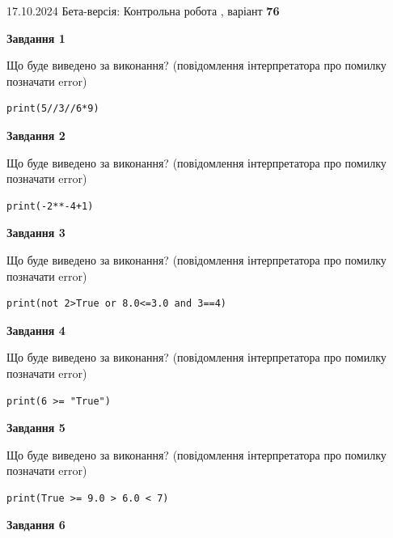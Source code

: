\documentclass[12pt, ukrainian]{article}
\begin{document}
{\Large{17.10.2024 Бета-версія: Контрольна робота , варіант  \No \textbf { 76 }\par}}
{
\begin {large}
{\begin {center}\textbf{Завдання 1}\end {center}}

Що буде виведено за виконання? (повідомлення інтерпретатора про помилку позначати error)\par
\begin{verbatim}
print(5//3//6*9)
\end{verbatim}

{\begin {center}\textbf{Завдання 2}\end {center}}

Що буде виведено за виконання? (повідомлення інтерпретатора про помилку позначати error)\par
\begin{verbatim}
print(-2**-4+1)
\end{verbatim}

{\begin {center}\textbf{Завдання 3}\end {center}}

Що буде виведено за виконання? (повідомлення інтерпретатора про помилку позначати error)\par
\begin{verbatim}
print(not 2>True or 8.0<=3.0 and 3==4)
\end{verbatim}

{\begin {center}\textbf{Завдання 4}\end {center}}

Що буде виведено за виконання? (повідомлення інтерпретатора про помилку позначати error)\par
\begin{verbatim}
print(6 >= "True")
\end{verbatim}

{\begin {center}\textbf{Завдання 5}\end {center}}

Що буде виведено за виконання? (повідомлення інтерпретатора про помилку позначати error)\par
\begin{verbatim}
print(True >= 9.0 > 6.0 < 7)
\end{verbatim}

{\begin {center}\textbf{Завдання 6}\end {center}}


\end{large}}
\end{document}
